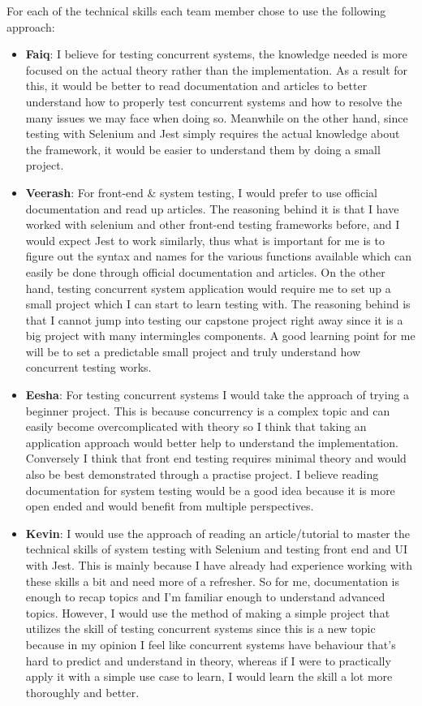 \documentclass[12pt, titlepage]{article}
\begin{document}
\begin{enumerate}
		For each of the technical skills each team member chose to use the following approach:
		
		\begin{itemize}
			\item \textbf{Faiq}: I believe for testing concurrent systems, the knowledge needed is more focused on the actual theory rather than the implementation. As a result for this, it would be better to read documentation and articles to better understand how to properly test concurrent systems and how to resolve the many issues we may face when doing so. Meanwhile on the other hand, since testing with Selenium and Jest simply requires the actual knowledge about the framework, it would be easier to understand them by doing a small project.
			
			\item \textbf{Veerash}: For front-end \& system testing, I would prefer to use official documentation and read up articles. The reasoning behind it is that I have worked with selenium and other front-end testing frameworks before, and I would expect Jest to work similarly, thus what is important for me is to figure out the syntax and names for the various functions available which can easily be done through official documentation and articles. On the other hand, testing concurrent system application would require me to set up a small project which I can start to learn testing with. The reasoning behind is that I cannot jump into testing our capstone project right away since it is a big project with many intermingles components. A good learning point for me will be to set a predictable small project and truly understand how concurrent testing works.
			
			\item \textbf{Eesha}: For testing concurrent systems I would take the approach of trying a beginner project. This is because concurrency is a complex topic and can easily become overcomplicated with theory so I think that taking an application approach would better help to understand the implementation. Conversely I think that front end testing requires minimal theory and would also be best demonstrated through a practise project. I believe reading documentation for system testing would be a good idea because it is more open ended and would benefit from multiple perspectives. 
			
			\item \textbf{Kevin}: I would use the approach of reading an article/tutorial to master the technical skills of system testing with Selenium and testing front end and UI with Jest. This is mainly because I have already had experience working with these skills a bit and need more of a refresher. So for me, documentation is enough to recap topics and I'm familiar enough to understand advanced topics. However, I would use the method of making a simple project that utilizes the skill of testing concurrent systems since this is a new topic because in my opinion I feel like concurrent systems have behaviour that's hard to predict and understand in theory, whereas if I were to practically apply it with a simple use case to learn, I would learn the skill a lot more thoroughly and better. 
			

\end{itemize}
\end{enumerate}
\end{document}
